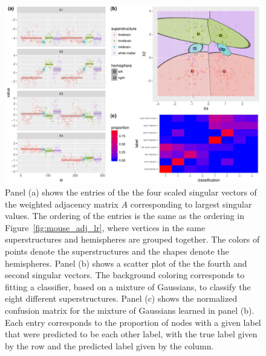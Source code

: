 \documentclass[journal,twoside,web]{ieeecolor}
\begin{document}
\begin{figure}[tbh!]
	\centering
	\includegraphics[width=\linewidth]{mouse_connectome_ase_w_error_table.pdf}
	\caption{
	Panel (a) shows the entries of the the four scaled singular vectors  of the weighted adjacency matrix $A$ corresponding to largest singular values.
	The ordering of the entries is the same as the ordering in Figure~\ref{fig:mouse_adj_lr}, where vertices in the same superstructures and hemispheres are grouped together. 
	The colors of points denote the superstructures and the shapes denote the hemispheres.
	Panel (b) shows a scatter plot of the the fourth and second singular vectors. 
	The background coloring corresponds to fitting a classifier, based on a mixture of Gaussians, to classify the eight different superstructures.
	Panel (c) shows the normalized confusion matrix for the mixture of Gaussians learned in panel (b).
    Each entry corresponds to the proportion of nodes with a given label that were predicted to be each other label,
    with the true label given by the row and the predicted label given by the column.}
	\label{fig:mouse_ase}
\end{figure}
\end{document}
